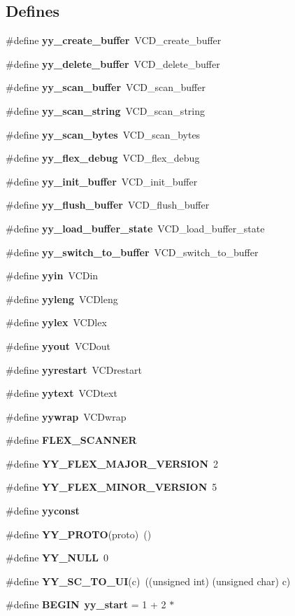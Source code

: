 \subsection*{Defines}
\begin{CompactItemize}
\item 
\#define {\bf yy\_\-create\_\-buffer}\ VCD\_\-create\_\-buffer
\item 
\#define {\bf yy\_\-delete\_\-buffer}\ VCD\_\-delete\_\-buffer
\item 
\#define {\bf yy\_\-scan\_\-buffer}\ VCD\_\-scan\_\-buffer
\item 
\#define {\bf yy\_\-scan\_\-string}\ VCD\_\-scan\_\-string
\item 
\#define {\bf yy\_\-scan\_\-bytes}\ VCD\_\-scan\_\-bytes
\item 
\#define {\bf yy\_\-flex\_\-debug}\ VCD\_\-flex\_\-debug
\item 
\#define {\bf yy\_\-init\_\-buffer}\ VCD\_\-init\_\-buffer
\item 
\#define {\bf yy\_\-flush\_\-buffer}\ VCD\_\-flush\_\-buffer
\item 
\#define {\bf yy\_\-load\_\-buffer\_\-state}\ VCD\_\-load\_\-buffer\_\-state
\item 
\#define {\bf yy\_\-switch\_\-to\_\-buffer}\ VCD\_\-switch\_\-to\_\-buffer
\item 
\#define {\bf yyin}\ VCDin
\item 
\#define {\bf yyleng}\ VCDleng
\item 
\#define {\bf yylex}\ VCDlex
\item 
\#define {\bf yyout}\ VCDout
\item 
\#define {\bf yyrestart}\ VCDrestart
\item 
\#define {\bf yytext}\ VCDtext
\item 
\#define {\bf yywrap}\ VCDwrap
\item 
\#define {\bf FLEX\_\-SCANNER}
\item 
\#define {\bf YY\_\-FLEX\_\-MAJOR\_\-VERSION}\ 2
\item 
\#define {\bf YY\_\-FLEX\_\-MINOR\_\-VERSION}\ 5
\item 
\#define {\bf yyconst}
\item 
\#define {\bf YY\_\-PROTO}(proto)\ ()
\item 
\#define {\bf YY\_\-NULL}\ 0
\item 
\#define {\bf YY\_\-SC\_\-TO\_\-UI}(c)\ ((unsigned int) (unsigned char) c)
\item 
\#define {\bf BEGIN}\ {\bf yy\_\-start} = 1 + 2 $\ast$

\end{CompactItemize}

